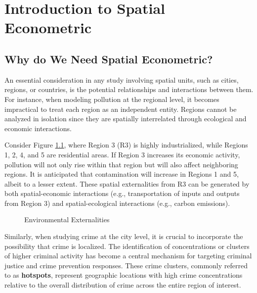 \chapter{Introduction to Spatial Econometric}\label{chapater:Introduction}


\section{Why do We Need Spatial Econometric?}\label{sec:why_se}

An essential consideration in any study involving spatial units, such as cities, regions, or countries, is the potential relationships and interactions between them. For instance, when modeling pollution at the regional level, it becomes impractical to treat each region as an independent entity. Regions cannot be analyzed in isolation since they are spatially interrelated through ecological and economic interactions.

Consider Figure \ref{fig:example_poll}, where Region 3 (R3) is highly industrialized, while Regions 1, 2, 4, and 5 are residential areas. If Region 3 increases its economic activity, pollution will not only rise within that region but will also affect neighboring regions. It is anticipated that contamination will increase in Regions 1 and 5, albeit to a lesser extent. These spatial externalities from R3 can be generated by both spatial-economic interactions (e.g., transportation of inputs and outputs from Region 3) and spatial-ecological interactions (e.g., carbon emissions).

\begin{figure}[h]
\caption{Environmental Externalities}
\label{fig:example_poll}
\centering
{}
\end{figure}

Similarly, when studying crime at the city level, it is crucial to incorporate the possibility that crime is localized. The identification of concentrations or clusters of higher criminal activity has become a central mechanism for targeting criminal justice and crime prevention responses. These crime clusters, commonly referred to as \textbf{hotspots}, represent geographic locations with high crime concentrations relative to the overall distribution of crime across the entire region of interest.

